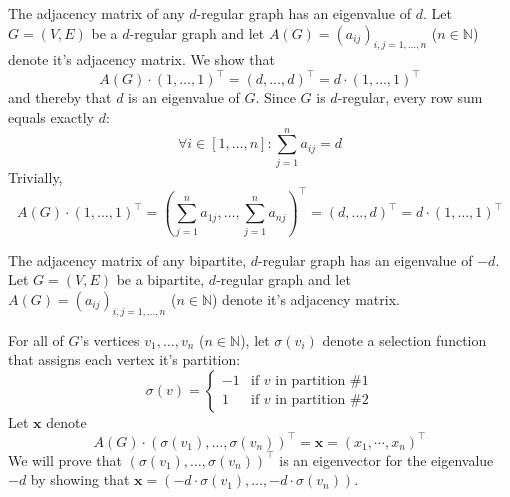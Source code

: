 \documentclass[a4paper]{article}
\begin{document}
	\begin{solution}{32}
		\begin{theorem}{The adjacency matrix of any $d$-regular graph has an eigenvalue of $d$.}
			Let $G = (V, E)$ be a $d$-regular graph and let $A(G) = (a_{ij})_{i, j = 1,\dots, n}$ ($n \in \mathbb{N}$) denote it's adjacency matrix. We show that
				\begin{equation*}
					A(G) \cdot (1, \dots ,1)^{\top} = (d,  \dots ,d)^{\top} = d \cdot (1,  \dots ,1)^{\top}
				\end{equation*}
			and thereby that $d$ is an eigenvalue of $G$. Since $G$ is $d$-regular, every row sum equals exactly $d$:
				\begin{equation*}
					\forall i \in [1, \dots, n]: \sum_{j=1}^{n} a_{ij} = d
				\end{equation*}
			Trivially,
				\begin{equation*}
					A(G) \cdot (1, \dots ,1)^{\top} =  (\sum_{j=1}^{n} a_{1j},  \dots , \sum_{j=1}^{n} a_{nj})^{\top} = (d, \dots, d)^\top = d \cdot (1,  \dots ,1)^{\top}
				\end{equation*}
		\end{theorem}

		\begin{theorem}{The adjacency matrix of any bipartite, $d$-regular graph has an eigenvalue of $-d$.}
			Let $G = (V, E)$ be a bipartite, $d$-regular graph and let $A(G) = (a_{ij})_{i, j = 1,\dots, n}$ ($n \in \mathbb{N}$) denote it's adjacency matrix.
			
			For all of $G$'s vertices $v_1, ..., v_n$ ($n \in \mathbb{N}$), let $\sigma(v_i)$ denote a selection function that assigns each vertex it's partition:
\[
 \sigma(v) =
  \begin{cases}
   -1 & \text{if } v \text{ in partition \#1}\\
   1 & \text{if } v \text{ in partition \#2}
  \end{cases}
\]
Let $\mathbf{x}$ denote
	\begin{equation*}
		A(G) \cdot (\sigma(v_1), \dots, \sigma(v_n))^\top = \mathbf{x} = (x_1, \cdots, x_n)^\top
	\end{equation*}
We will prove that $(\sigma(v_1), \dots, \sigma(v_n))^\top$ is an eigenvector for the eigenvalue $-d$ by showing that $\mathbf{x} = (-d \cdot \sigma(v_1), \dots, -d \cdot \sigma(v_n))$.\\


\end{theorem}
\end{solution}
\end{document}
